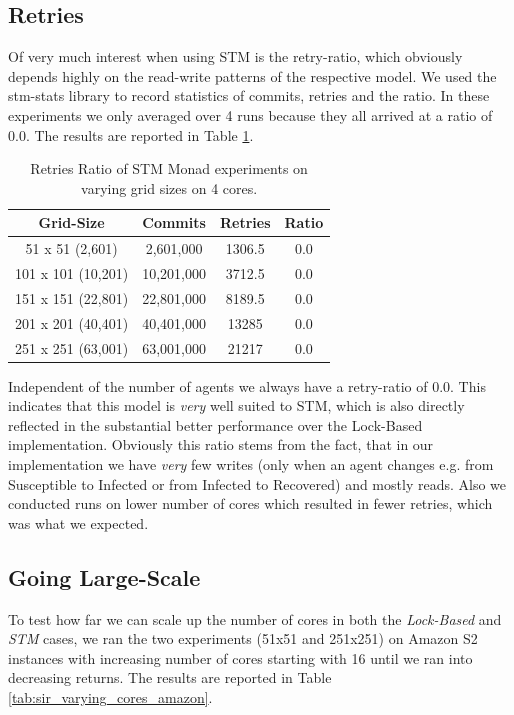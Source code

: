 \subsection{Retries}
Of very much interest when using STM is the retry-ratio, which obviously depends highly on the read-write patterns of the respective model. We used the stm-stats library to record statistics of commits, retries and the ratio. In these experiments we only averaged over 4 runs because they all arrived at a ratio of 0.0. The results are reported in Table \ref{tab:retries_stm}.

\begin{table}
	\centering
  	\begin{tabular}{ c || c | c | c }
        Grid-Size 		   & Commits    & Retries & Ratio \\ \hline \hline 
   		51 x 51 (2,601)    & 2,601,000  & 1306.5  & 0.0 \\ \hline
   		101 x 101 (10,201) & 10,201,000 & 3712.5  & 0.0 \\ \hline
   		151 x 151 (22,801) & 22,801,000 & 8189.5  & 0.0 \\ \hline
   		201 x 201 (40,401) & 40,401,000 & 13285   & 0.0 \\ \hline 
   		251 x 251 (63,001) & 63,001,000 & 21217   & 0.0
  	\end{tabular}
  	
  	\caption{Retries Ratio of STM Monad experiments on varying grid sizes on 4 cores.}
	\label{tab:retries_stm}
\end{table}

Independent of the number of agents we always have a retry-ratio of 0.0. This indicates that this model is \textit{very} well suited to STM, which is also directly reflected in the substantial better performance over the Lock-Based implementation. Obviously this ratio stems from the fact, that in our implementation we have \textit{very} few writes (only when an agent changes e.g. from Susceptible to Infected or from Infected to Recovered) and mostly reads. Also we conducted runs on lower number of cores which resulted in fewer retries, which was what we expected.

\subsection{Going Large-Scale}
To test how far we can scale up the number of cores in both the \textit{Lock-Based} and \textit{STM} cases, we ran the two experiments (51x51 and 251x251) on Amazon S2 instances with increasing number of cores starting with 16 until we ran into decreasing returns. The results are reported in Table \ref{tab:sir_varying_cores_amazon}.

